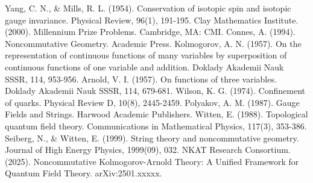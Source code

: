 \documentclass[12pt,a4paper]{article}
\begin{document}
\begin{thebibliography}{10}
 Yang, C. N., \& Mills, R. L. (1954). Conservation of isotopic spin and isotopic gauge invariance. Physical Review, 96(1), 191-195.
 Clay Mathematics Institute. (2000). Millennium Prize Problems. Cambridge, MA: CMI.
 Connes, A. (1994). Noncommutative Geometry. Academic Press.
 Kolmogorov, A. N. (1957). On the representation of continuous functions of many variables by superposition of continuous functions of one variable and addition. Doklady Akademii Nauk SSSR, 114, 953-956.
 Arnold, V. I. (1957). On functions of three variables. Doklady Akademii Nauk SSSR, 114, 679-681.
 Wilson, K. G. (1974). Confinement of quarks. Physical Review D, 10(8), 2445-2459.
 Polyakov, A. M. (1987). Gauge Fields and Strings. Harwood Academic Publishers.
 Witten, E. (1988). Topological quantum field theory. Communications in Mathematical Physics, 117(3), 353-386.
 Seiberg, N., \& Witten, E. (1999). String theory and noncommutative geometry. Journal of High Energy Physics, 1999(09), 032.
 NKAT Research Consortium. (2025). Noncommutative Kolmogorov-Arnold Theory: A Unified Framework for Quantum Field Theory. arXiv:2501.xxxxx.
\end{thebibliography}
\end{document}
